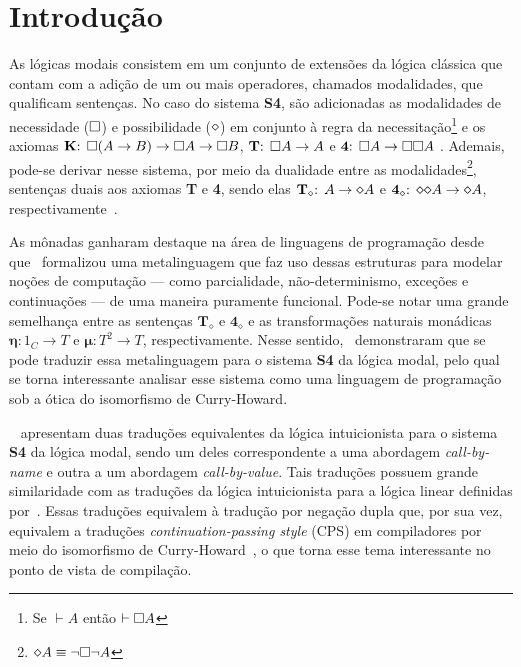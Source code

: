 \chapter{Introdução}

As lógicas modais consistem em um conjunto de extensões da lógica clássica que contam com a adição de um ou mais operadores, chamados modalidades, que qualificam sentenças. No caso do sistema \textbf{S4}, são adicionadas as modalidades de necessidade ($\Box$) e possibilidade ($\pos$) em conjunto à regra da necessitação\footnote{Se $\vdash A$ então $\vdash \Box A$} e os axiomas $\mathbf{K}\text{: } \Box(A \to B) \to \Box A \to \Box B$, $\mathbf{T}\text{: } \Box A \to A$ e $\text{\textbf{4}: } \Box A \to \Box \Box A$ \citep{Troelstra}. Ademais, pode-se derivar nesse sistema, por meio da dualidade entre as modalidades\footnote{$\pos A \equiv \neg \nec \neg A $}, sentenças duais aos axiomas \textbf{T} e \textbf{4}, sendo elas $\mathbf{T}_\diamond \text{: } A \to \pos A$ e $\mathbf{4}_\diamond \text{: } \pos \pos A \to \pos A$, respectivamente~\cite{Zach}.

As mônadas ganharam destaque na área de linguagens de programação desde que~\cite{Moggi} formalizou uma metalinguagem que faz uso dessas estruturas para modelar noções de computação --- como parcialidade, não-determinismo, exceções e continuações --- de uma maneira puramente funcional. Pode-se notar uma grande semelhança entre as sentenças $\mathbf{T}_\diamond$ e $\mathbf{4}_\diamond$ e as transformações naturais monádicas $\mathbf{\eta:} 1_C \to T$ e $\mathbf{\mu:} T^2 \to T$, respectivamente. Nesse sentido,~\cite{Pfenning} demonstraram que se pode traduzir essa metalinguagem para o sistema \textbf{S4} da lógica modal, pelo qual se torna interessante analisar esse sistema como uma linguagem de programação sob a ótica do isomorfismo de Curry-Howard.

~\cite{Troelstra} apresentam duas traduções equivalentes da lógica intuicionista para o sistema \textbf{S4} da lógica modal, sendo um deles correspondente a uma abordagem \textit{call-by-name} e outra a um abordagem \textit{call-by-value}. Tais traduções possuem grande similaridade com as traduções da lógica intuicionista para a lógica linear definidas por~\cite{Girard}. Essas traduções equivalem à tradução por negação dupla que, por sua vez, equivalem a traduções \textit{continuation-passing style} (CPS) em compiladores por meio do isomorfismo de Curry-Howard~\citep{Reynolds}, o que torna esse tema interessante no ponto de vista de compilação.

